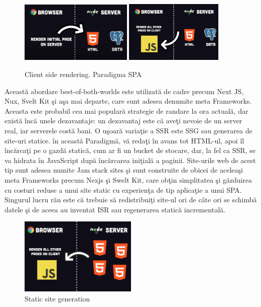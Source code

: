 \documentclass[12pt, a4paper]{report}
\begin{document}
\begin{figure}[htbp]
	\centering
	\includegraphics[width=0.48\textwidth]{39.png}
	\includegraphics[width=0.42\textwidth]{40.png}
	\caption{Client side rendering. Paradigma SPA}
	\label{fig:server rendering with hydration}
\end{figure}

Aceast\u a abordare best-of-both-worlds este utilizat\u a de cadre precum Next JS, Nux, Svelt Kit \c si a\c sa mai departe, care sunt adesea denumite meta Frameworks. Aceasta este probabil cea mai popular\u a strategie de randare la ora actual\u a, dar exist\u a \^ inc\u a unele dezavantaje: un dezavantaj este c\u a ave\c ti nevoie de un server real, iar serverele cost\u a bani. O u\c soar\u a varia\c tie a SSR este SSG sau generarea de site-uri statice. \^ in aceast\u a Paradigm\u a, v\u a reda\c ti \^ in avans tot HTML-ul, apoi \^ il \^ inc\u arca\c ti pe o gazd\u a static\u a, cum ar fi un bucket de stocare, dar, la fel ca SSR, se va hidrata \^ in JavaScript dup\u a \^ inc\u arcarea ini\c tial\u a a paginii. Site-urile web de acest tip sunt adesea numite Jam stack sites \c si sunt construite de obicei de acelea\c si meta Frameworks precum Nexjs \c si Swelt Kit, care ob\c tin simplitatea \c si g\u azduirea cu costuri reduse a unui site static cu experien\c ta de tip aplica\c tie a unui SPA. Singurul lucru r\u au este c\u a trebuie s\u a redistribui\c ti site-ul ori de c\^ ate ori se schimb\u a datele \c si de aceea au inventat ISR sau regenerarea static\u a incremental\u a.

\begin{figure}[htbp]
	\centering
	\includegraphics[width=0.5\textwidth]{41.png}
	\caption{Static site generation}
	\label{fig:ssg}
\end{figure}
\end{document}
